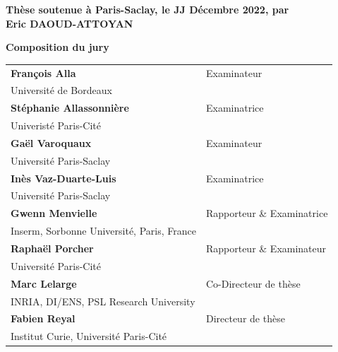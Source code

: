 \documentclass[12pt, a4paper]{book}
\begin{document}
\begin{titlepage}
  \textbf{Thèse soutenue à Paris-Saclay, le JJ Décembre 2022, par}\\
  \bigskip
  \Large {\color{Prune} \textbf{Eric DAOUD-ATTOYAN}} %

  \vspace{\fill} %

  \bigskip

  \flushleft
  \small \textbf{Composition du jury}\\
  \vspace{2mm}
  \scriptsize
  \begin{tabular}{|p{7cm}l}
    \arrayrulecolor{Prune}

    \textbf{François Alla}                     & Examinateur                \\
    Université de Bordeaux                     &                            \\
    \textbf{Stéphanie Allassonnière}           & Examinatrice               \\
    Univeristé Paris-Cité                      &                            \\
    \textbf{Gaël Varoquaux}                    & Examinateur                \\
    Université Paris-Saclay                    &                            \\
    \textbf{Inès Vaz-Duarte-Luis}              & Examinatrice               \\
    Université Paris-Saclay                    &                            \\
    \textbf{Gwenn Menvielle}                   & Rapporteur \& Examinatrice \\
    Inserm, Sorbonne Université, Paris, France &                            \\
    \textbf{Raphaël Porcher}                   & Rapporteur \& Examinateur  \\
    Université Paris-Cité                      &                            \\
    \textbf{Marc Lelarge}                      & Co-Directeur de thèse      \\
    INRIA, DI/ENS, PSL Research University     &                            \\
    \textbf{Fabien Reyal}                      & Directeur de thèse         \\
    Institut Curie, Université Paris-Cité      &                            \\
  \end{tabular}

\end{titlepage}
\end{document}

